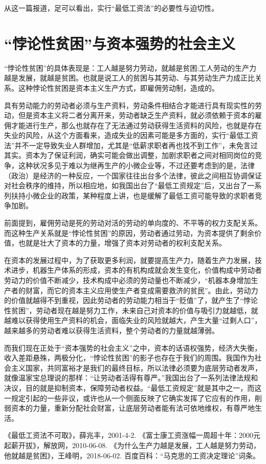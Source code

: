\documentclass[UTF8]{ctexart}
\begin{document}
从这一篇报道，足可以看出，实行“最低工资法”的必要性与迫切性。

\section{“悖论性贫困”与资本强势的社会主义}
“悖论性贫困”的具体表现是：工人越是努力劳动，就越是贫困;工人劳动的生产力越是发展，就越是贫困。也就是说工人的贫困与其劳动、与其劳动生产力成正比关系。这种悖论性贫困是资本主义生产方式，即雇佣劳动制，造成的。

具有劳动能力的劳动者必须与生产资料，劳动条件相结合才能进行具有现实性的劳动，但是资本主义将二者分离开来，劳动者缺乏生产资料，就必须依赖于资本的雇佣才能进行生产，那么也就存在了无法通过劳动获得生活资料的风险，也就是存在失业的风险，从这个方面看来，造成失业的因素可能是多方面的，实行“最低工资法”并不一定导致失业人群增加，尤其是“低薪求职者再也找不到工作”，未免言过其实。资本为了保证利润，确实可能会做出调整，加剧求职者之间对相同岗位的竞争，这种状况多见于难以为继再生产的小微企业等，不过还要考虑到的是，法律（政治）是经济的一种反应，一个国家往往出台多个法律，彼此之间相互协调保证对社会秩序的维持，所以相应地，如我国出台了“最低工资规定”后，又出台了一系列扶持小微企业的政策，某种程度上讲，也是缓解了最低工资可能导致的求职者竞争加剧。

前面提到，雇佣劳动是死的劳动对活的劳动的单向度的、不平等的权力支配关系。而这种生产关系就是“悖论性贫困”的原因，劳动者通过劳动，为资本提供了剩余价值，也就是壮大了资本的力量，增强了资本对劳动者的权利支配关系。

在资本的发展过程中，为了获取更多利润，就要提高生产力，随着生产力发展，技术进步，机器生产体系的形成，资本的有机构成就会发生变化，价值构成中劳动者劳动力的价值不断减少，技术构成中必须的劳动量也不断减少，“机器本身增加生产者的财富，而它的资本主义应用使生产者变成需要救济的贫民”。由此，劳动力的价值就越得不到重视，因此劳动者的劳动能力相当于“贬值”了，就产生了“悖论性贫困”，劳动者现在越是努力工作，未来自己对资本的价值与吸引力就越低，就越难以获得使用生产资料的机会，面临失业的风险就越大，产生大量“过剩人口”，越来越多的劳动者难以获得生活资料，整个劳动者的力量就越薄弱。

而我们现在正处于“资本强势的社会主义”之中，资本的话语权强势，经济大失衡，收入差距悬殊，两极分化，“悖论性贫困”的影子也存在于我们的周围。我国作为社会主义国家，共同富裕才是我们的最终目标，所以法律必须要为底层劳动者发声，就像温家宝总理说的那样：“让劳动者活得有尊严。”我国出台了一系列法律法规和决议，目的就是抑制资本，保障劳动者权益。“最低工资规定”就是其中之一，而这一规定引起的一些非议，或许也从一个侧面反映了它确实发挥了它应有的作用，削弱资本的力量，重新分配社会财富，让底层劳动者能有法可依地维权，有尊严地生活。


\begin{thebibliography}{123456} 
 《最低工资法不可取》，薛兆丰，2001-4-2.
 《富士康工资涨幅一周超十年：2000元起薪开拔》，解放网，2010-06-08.
 《为什么生产力越是发展，工人越是努力劳动，他就越是贫困》，王峰明，2018-06-02.
 百度百科：“马克思的工资决定理论”词条。
\end{thebibliography}
\end{document}
